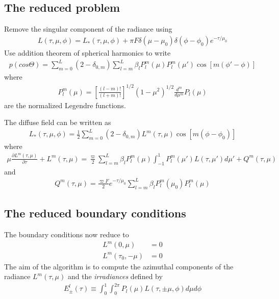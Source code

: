 \documentclass[11pt]{article}
\newcommand{\pfrac}[2]{\frac{\partial #1}{\partial #2}}
\begin{document}
\subsection{The reduced problem}
Remove the singular component of the radiance using
\begin{align}
  L(\tau,\mu,\phi) = L_*(\tau,\mu,\phi) 
  + \pi F \delta(\mu-\mu_0) \delta(\phi-\phi_0) e^{-\tau/\mu_0}
\end{align}
Use addition theorem of spherical harmonics to write
\begin{align}
  p(cos\Theta) = \sum_{m=0}^L(2-\delta_{0,m})
  \sum_{l=m}^L\beta_l P_l^m(\mu) P_l^m(\mu')
  \cos[m(\phi'-\phi)]
\end{align}
where
\begin{align}
  P_l^m(\mu) = \left[
    \frac{(l-m)!}{(l+m)!}
  \right]^{1/2}
  (1-\mu^2)^{1/2}\frac{d^m}{d\mu^m}
  P_l(\mu)
\end{align}
are the normalized Legendre functions.

The diffuse field can be written as
\begin{align}
  L_*(\tau,\mu,\phi) = \frac{1}{2} \sum_{m=0}^L
  (2-\delta_{0,m})L^m(\tau,\mu) \cos[m(\phi-\phi_0)]
\end{align}
where
\begin{align}
  \mu\pfrac{L^m(\tau,\mu)}{\tau} + L^m(\tau,\mu)
  = 
  \frac{\varpi}{2}
  \sum_{l=m}^L \beta_l P_l^m(\mu)
  \int_{-1}^1
  P_l^m(\mu') L(\tau,\mu') d\mu'
  + Q^m(\tau,\mu)
\end{align}
and 
\begin{align}
  Q^m(\tau,\mu) = \frac{\varpi F}{2}e^{-\tau/\mu_0}
  \sum_{l=m}^L \beta_l P^m_l(\mu_0) P_l^m(\mu)
\end{align}




\subsection{The reduced boundary conditions}
The boundary conditions now reduce to
\begin{align}
  L^m(0, \mu) &= 0 \\
  L^m(\tau_0, -\mu) &= 0
\end{align}
The aim of the algorithm is to compute the azimuthal components of
the radiance $L^m(\tau,\mu)$ and the \emph{irradiances} defined by
\begin{align}
  E_\pm^l(\tau) \equiv \int_0^1 \int_0^{2\pi}
  P_l(\mu) L(\tau,\pm \mu, \phi) d\mu d\phi
\end{align}
\end{document}
